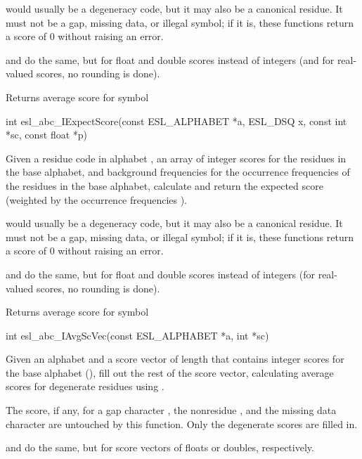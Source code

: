 \begin{sreapi}
 would usually be a degeneracy code, but it
may also be a canonical residue. It must not
be a gap, missing data, or illegal symbol; if it
is, these functions return a score of 0 without
raising an error.

 and  do the
same, but for float and double scores instead of integers
(and for real-valued scores, no rounding is done).

Returns average score for symbol           


\hypertarget{func:esl_abc_IExpectScore()}
{\item[int esl\_abc\_IExpectScore(const ESL\_ALPHABET *a, ESL\_DSQ x, const int *sc, const float *p)]}

Given a residue code  in alphabet , an
array of integer scores  for the residues in the base
alphabet, and background frequencies  for the
occurrence frequencies of the residues in the base
alphabet, calculate and return the expected score
(weighted by the occurrence frequencies ).

 would usually be a degeneracy code, but it
may also be a canonical residue. It must not
be a gap, missing data, or illegal symbol; if it
is, these functions return a score of 0 without
raising an error.

 and  do the
same, but for float and double scores instead of integers
(for real-valued scores, no rounding is done).

Returns average score for symbol           


\hypertarget{func:esl_abc_IAvgScVec()}
{\item[int esl\_abc\_IAvgScVec(const ESL\_ALPHABET *a, int *sc)]}

Given an alphabet  and a score vector  of length
 that contains integer scores for the base
alphabet (), fill out the rest of the score 
vector, calculating average scores for 
degenerate residues using .

The score, if any, for a gap character , the
nonresidue , and the missing data character 
are untouched by this function. Only the degenerate
scores  are filled in.

 and  do
the same, but for score vectors of floats or doubles,
respectively.


\end{sreapi}
